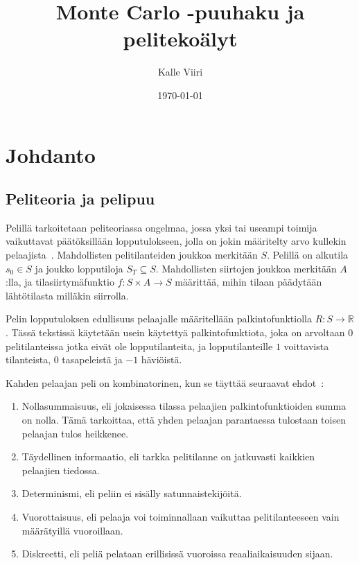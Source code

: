 \documentclass[12pt,finnish]{tktltiki2}
\title{Monte Carlo -puuhaku ja pelitekoälyt}
\author{Kalle Viiri}
\date{\today}
\theoremstyle{definition}
\theoremstyle{remark}
\begin{document}

\frontmatter      %

\maketitle        %
\makeabstract     %

\tableofcontents  %


\mainmatter       %

\section{Johdanto}

\subsection{Peliteoria ja pelipuu}

Pelillä tarkoitetaan peliteoriassa ongelmaa, jossa yksi tai useampi toimija vaikuttavat päätöksillään lopputulokseen, jolla on jokin määritelty arvo kullekin pelaajista~\cite{browne}. Mahdollisten pelitilanteiden joukkoa merkitään $S$. Pelillä on alkutila $s_0 \in S$ ja joukko lopputiloja $S_T \subseteq S$. Mahdollisten siirtojen joukkoa merkitään $A$:lla, ja tilasiirtymäfunktio $f : S \times A \rightarrow S$ määrittää, mihin tilaan päädytään lähtötilasta milläkin siirrolla.

Pelin lopputuloksen edullisuus pelaajalle määritellään palkintofunktiolla $R : S \rightarrow \mathbb{R}$. Tässä tekstissä käytetään usein käytettyä palkintofunktiota, joka on arvoltaan $0$ pelitilanteissa jotka eivät ole lopputilanteita, ja lopputilanteille $1$ voittavista tilanteista, $0$ tasapeleistä ja $-1$ häviöistä.

Kahden pelaajan peli on kombinatorinen, kun se täyttää seuraavat ehdot~\cite{browne}:

\begin{enumerate}[label=\roman*.]
	\item Nollasummaisuus, eli jokaisessa tilassa pelaajien palkintofunktioiden summa on nolla. Tämä tarkoittaa, että yhden pelaajan parantaessa tulostaan toisen pelaajan tulos heikkenee.
	 \item Täydellinen informaatio, eli tarkka pelitilanne on jatkuvasti kaikkien pelaajien tiedossa.
	 \item Determinismi, eli peliin ei sisälly satunnaistekijöitä.
	 \item Vuorottaisuus, eli pelaaja voi toiminnallaan vaikuttaa pelitilanteeseen vain määrätyillä vuoroillaan.
	 \item Diskreetti, eli peliä pelataan erillisissä vuoroissa reaaliaikaisuuden sijaan.
\end{enumerate}
\end{document}
